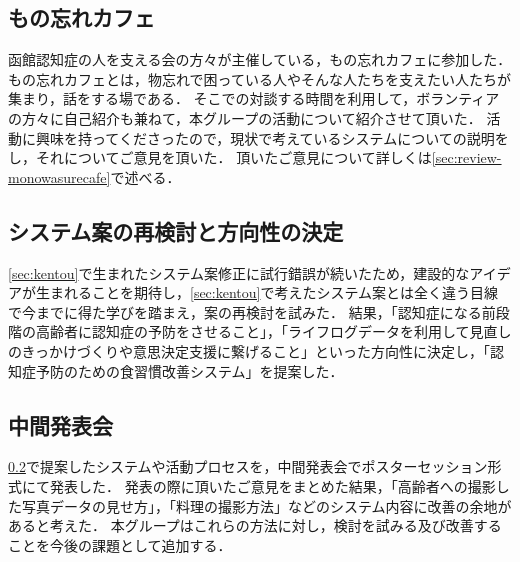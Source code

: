 \documentclass[../report]{subfiles}
\begin{document}
\subsection{もの忘れカフェ}
函館認知症の人を支える会の方々が主催している，もの忘れカフェに参加した．
もの忘れカフェとは，物忘れで困っている人やそんな人たちを支えたい人たちが集まり，話をする場である．
そこでの対談する時間を利用して，ボランティアの方々に自己紹介も兼ねて，本グループの活動について紹介させて頂いた．
活動に興味を持ってくださったので，現状で考えているシステムについての説明をし，それについてご意見を頂いた．
頂いたご意見について詳しくは\ref{sec:review-monowasurecafe}で述べる．

\subsection{システム案の再検討と方向性の決定}\label{sec:saikentou}
\ref{sec:kentou}で生まれたシステム案修正に試行錯誤が続いたため，建設的なアイデアが生まれることを期待し，\ref{sec:kentou}で考えたシステム案とは全く違う目線で今までに得た学びを踏まえ，案の再検討を試みた．
結果，「認知症になる前段階の高齢者に認知症の予防をさせること」，「ライフログデータを利用して見直しのきっかけづくりや意思決定支援に繋げること」といった方向性に決定し，「認知症予防のための食習慣改善システム」を提案した．

\subsection{中間発表会}
\ref{sec:saikentou}で提案したシステムや活動プロセスを，中間発表会でポスターセッション形式にて発表した．
発表の際に頂いたご意見をまとめた結果，「高齢者への撮影した写真データの見せ方」，「料理の撮影方法」などのシステム内容に改善の余地があると考えた．
本グループはこれらの方法に対し，検討を試みる及び改善することを今後の課題として追加する．
\end{document}
